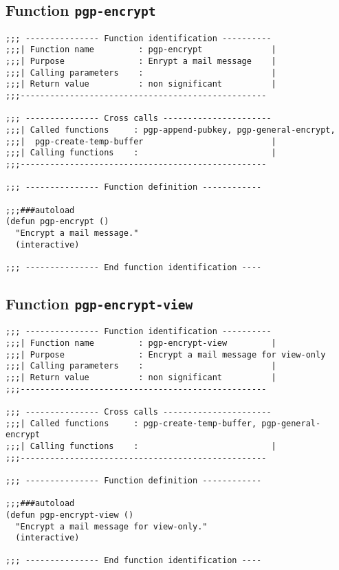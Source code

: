 \subsection{Function {\tt pgp-encrypt}}
\leavevmode
\begin{verbatim}
;;; --------------- Function identification ----------
;;;| Function name         : pgp-encrypt              |
;;;| Purpose               : Enrypt a mail message    |
;;;| Calling parameters    :                          |
;;;| Return value          : non significant          |
;;;--------------------------------------------------

;;; --------------- Cross calls ----------------------
;;;| Called functions     : pgp-append-pubkey, pgp-general-encrypt,
;;;|  pgp-create-temp-buffer                          |
;;;| Calling functions    :                           |
;;;--------------------------------------------------

;;; --------------- Function definition ------------

;;;###autoload
(defun pgp-encrypt ()
  "Encrypt a mail message."
  (interactive)

;;; --------------- End function identification ----
\end{verbatim}
\subsection{Function {\tt pgp-encrypt-view}}
\leavevmode
\begin{verbatim}
;;; --------------- Function identification ----------
;;;| Function name         : pgp-encrypt-view         |
;;;| Purpose               : Encrypt a mail message for view-only
;;;| Calling parameters    :                          |
;;;| Return value          : non significant          |
;;;--------------------------------------------------

;;; --------------- Cross calls ----------------------
;;;| Called functions     : pgp-create-temp-buffer, pgp-general-encrypt
;;;| Calling functions    :                           |
;;;--------------------------------------------------

;;; --------------- Function definition ------------

;;;###autoload
(defun pgp-encrypt-view ()
  "Encrypt a mail message for view-only."
  (interactive)

;;; --------------- End function identification ----
\end{verbatim}
